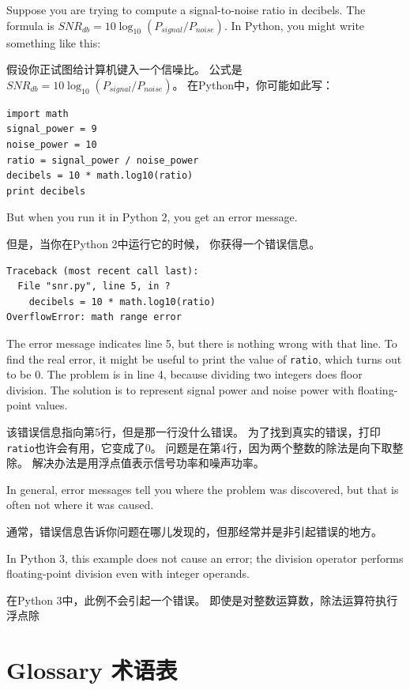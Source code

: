 \documentclass[10pt]{book}
\begin{document}
\begin{CJK}{UTF8}{gbsn}
Suppose you are trying
to compute a signal-to-noise ratio in decibels.  The formula
is $SNR_{db} = 10 \log_{10} (P_{signal} / P_{noise})$.  In Python,
you might write something like this:

假设你正试图给计算机键入一个信噪比。
公式是$SNR_{db} = 10 \log_{10} (P_{signal} / P_{noise})$。
在Python中，你可能如此写：

\begin{verbatim}
import math
signal_power = 9
noise_power = 10
ratio = signal_power / noise_power
decibels = 10 * math.log10(ratio)
print decibels
\end{verbatim}
%
But when you run it in Python 2, you get an error message.

但是，当你在Python 2中运行它的时候，
你获得一个错误信息。

\begin{verbatim}
Traceback (most recent call last):
  File "snr.py", line 5, in ?
    decibels = 10 * math.log10(ratio)
OverflowError: math range error
\end{verbatim}
%
The error message indicates line 5, but there is nothing
wrong with that line.  To find the real error, it might be
useful to print the value of {\tt ratio}, which turns out to
be 0.  The problem is in line 4, because dividing two integers
does floor division.  The solution is to represent signal power
and noise power with floating-point values.

该错误信息指向第5行，但是那一行没什么错误。
为了找到真实的错误，打印{\tt ratio}也许会有用，它变成了0。
问题是在第4行，因为两个整数的除法是向下取整除。
解决办法是用浮点值表示信号功率和噪声功率。

In general, error messages tell you where the problem was discovered, 
but that is often not where it was caused.

通常，错误信息告诉你问题在哪儿发现的，但那经常并是非引起错误的地方。

In Python 3, this example does not cause an error; the division operator
performs floating-point division even with integer operands.

在Python 3中，此例不会引起一个错误。
即使是对整数运算数，除法运算符执行浮点除


\section{Glossary 术语表}

\begin{description}


\end{description}
\end{CJK}
\end{document}
